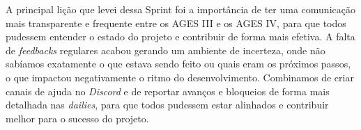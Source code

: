 A principal lição que levei dessa Sprint foi a importância de ter uma comunicação mais transparente e frequente entre os AGES III e os AGES IV, para que todos pudessem entender o estado do projeto e contribuir de forma mais efetiva. A falta de \textit{feedbacks} regulares acabou gerando um ambiente de incerteza, onde não sabíamos exatamente o que estava sendo feito ou quais eram os próximos passos, o que impactou negativamente o ritmo do desenvolvimento. Combinamos de criar canais de ajuda no \textit{Discord} e de reportar avanços e bloqueios de forma mais detalhada nas \textit{dailies}, para que todos pudessem estar alinhados e contribuir melhor para o sucesso do projeto.
